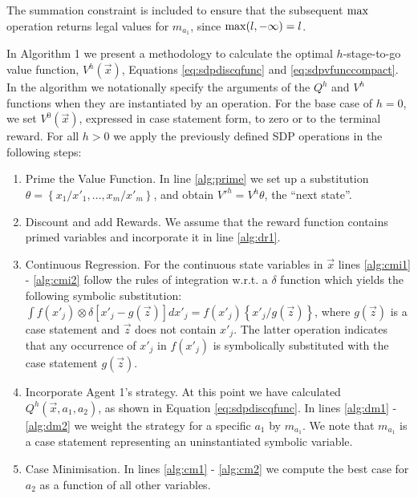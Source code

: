 The summation constraint is included to ensure that the subsequent
$\mathrm{max}$ operation returns legal values for $m_{a_1}$, since
$\mathrm{max}(l, -\infty) = l$.

In Algorithm 1 we present a methodology to calculate the optimal 
$h$-stage-to-go value function, $V^h(\vec{x})$, Equations \eqref{eq:sdpdiscqfunc} and 
\eqref{eq:sdpvfunccompact}. In the algorithm we notationally specify 
the arguments of the $Q^h$ and $V^h$ functions when they are 
instantiated by an operation. For the base case of $h = 0$, we set $V^0(\vec{x})$, expressed in 
case statement form, to zero or to the terminal reward. For all $h > 0$
we apply the previously defined SDP operations in the following steps:
\begin{enumerate}
  \item Prime the Value Function. 
            In line \ref{alg:prime} we set up a 
            substitution $\theta = \left\{ x_1/x'_1, \ldots, x_m/x'_m \right\}$, 
            and obtain $V'^{h} = V^{h}\theta$, the ``next state''.
  \item Discount and add Rewards. 
            We assume that the reward function
          contains primed variables and incorporate it in line \ref{alg:dr1}.
  \item Continuous Regression. For the continuous state variables in $\vec{x}$
            lines \ref{alg:cmi1} - \ref{alg:cmi2} follow the rules of integration w.r.t. a $\delta$ function 
            \cite{Sanner_UAI_2011} which yields the following symbolic
            substitution: 
            $\int f(x'_j) \otimes \delta\left[ x'_j - g(\vec{z})\right] dx'_j = f(x'_j)\left\{ x'_j/g(\vec{z})\right\}$,
            where $g(\vec{z})$ is a case statement and $\vec{z}$ does not contain $x'_j$.
            The latter operation indicates that any occurrence of $x'_j$ in $f(x'_j)$ is symbolically substituted
            with the case statement $g(\vec{z})$.
  \item Incorporate Agent 1's strategy. 
            At this point we have calculated $Q^h(\vec{x}, a_1, a_2)$, as shown in
            Equation \eqref{eq:sdpdiscqfunc}. In lines \ref{alg:dm1} - \ref{alg:dm2} 
            we weight the strategy for a specific $a_1$ by $m_{a_{1}}$.
            We note that $m_{a_{1}}$ is a case statement representing
            an uninstantiated symbolic variable.
  \item Case Minimisation. 
            In lines \ref{alg:cm1} - \ref{alg:cm2} we compute the best case for 
            $a_2$ as a function of all other variables. 

\end{enumerate}
